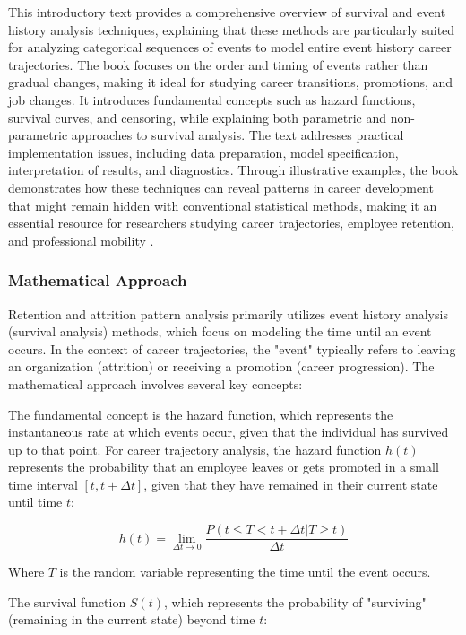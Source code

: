 \documentclass[../main.tex]{subfiles}
\begin{document}
This introductory text provides a comprehensive overview of survival and event history analysis techniques, explaining that these methods are particularly suited for analyzing categorical sequences of events to model entire event history career trajectories. The book focuses on the order and timing of events rather than gradual changes, making it ideal for studying career transitions, promotions, and job changes. It introduces fundamental concepts such as hazard functions, survival curves, and censoring, while explaining both parametric and non-parametric approaches to survival analysis. The text addresses practical implementation issues, including data preparation, model specification, interpretation of results, and diagnostics. Through illustrative examples, the book demonstrates how these techniques can reveal patterns in career development that might remain hidden with conventional statistical methods, making it an essential resource for researchers studying career trajectories, employee retention, and professional mobility \citep{mills2011introducing}.

\subsubsection{Mathematical Approach}

Retention and attrition pattern analysis primarily utilizes event history analysis (survival analysis) methods, which focus on modeling the time until an event occurs. In the context of career trajectories, the "event" typically refers to leaving an organization (attrition) or receiving a promotion (career progression). The mathematical approach involves several key concepts:

The fundamental concept is the hazard function, which represents the instantaneous rate at which events occur, given that the individual has survived up to that point. For career trajectory analysis, the hazard function \(h(t)\) represents the probability that an employee leaves or gets promoted in a small time interval \([t, t+\Delta t]\), given that they have remained in their current state until time \(t\):

\[h(t) = \lim_{\Delta t \to 0} \frac{P(t \leq T < t+\Delta t | T \geq t)}{\Delta t}\]

Where \(T\) is the random variable representing the time until the event occurs.

The survival function \(S(t)\), which represents the probability of "surviving" (remaining in the current state) beyond time \(t\):
\end{document}

